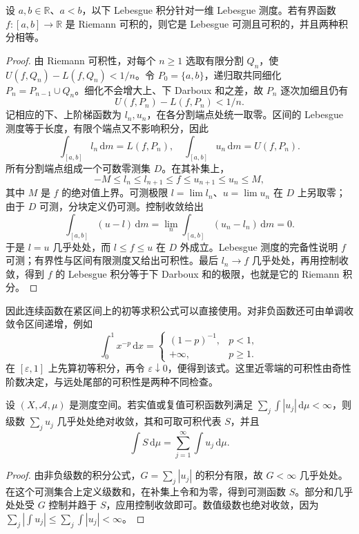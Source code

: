\begin{proposition}\label{b1:prop:riemann-lebesgue-compatibility}
设 \(a,b\in\mathbb R\)、\(a<b\)，以下 Lebesgue 积分针对一维 Lebesgue 测度。若有界函数 \(f:[a,b]\rightarrow\mathbb R\) 是 Riemann 可积的，则它是 Lebesgue 可测且可积的，并且两种积分相等。
\end{proposition}
\begin{proof}
由 Riemann 可积性，对每个 \(n\geq1\) 选取有限分割 \(Q_n\)，使 \(U(f,Q_n)-L(f,Q_n)<1/n\)。令 \(P_0=\{a,b\}\)，递归取共同细化 \(P_n=P_{n-1}\cup Q_n\)。细化不会增大上、下 Darboux 和之差，故 \(P_n\) 逐次加细且仍有
\[
U(f,P_n)-L(f,P_n)<1/n.
\]
记相应的下、上阶梯函数为 \(l_n,u_n\)，在各分割端点处统一取零。区间的 Lebesgue 测度等于长度，有限个端点又不影响积分，因此
\[
\int_{[a,b]}l_n\,\mathrm dm=L(f,P_n),
\quad
\int_{[a,b]}u_n\,\mathrm dm=U(f,P_n).
\]
所有分割端点组成一个可数零测集 \(D\)。在其补集上，
\[
-M\leq l_n\leq l_{n+1}\leq f\leq u_{n+1}\leq u_n\leq M,
\]
其中 \(M\) 是 \(f\) 的绝对值上界。可测极限 \(l=\lim l_n\)、\(u=\lim u_n\) 在 \(D\) 上另取零；由于 \(D\) 可测，分块定义仍可测。控制收敛给出
\[
\int_{[a,b]}(u-l)\,\mathrm dm
=\lim_n\int_{[a,b]}(u_n-l_n)\,\mathrm dm=0.
\]
于是 \(l=u\) 几乎处处，而 \(l\leq f\leq u\) 在 \(D\) 外成立。Lebesgue 测度的完备性说明 \(f\) 可测；有界性与区间有限测度又给出可积性。最后 \(l_n\to f\) 几乎处处，再用控制收敛，得到 \(f\) 的 Lebesgue 积分等于下 Darboux 和的极限，也就是它的 Riemann 积分。
\end{proof}

因此连续函数在紧区间上的初等求积公式可以直接使用。对非负函数还可由单调收敛令区间递增，例如
\[
\int_0^1 x^{-p}\,\mathrm dx=
\begin{cases}
(1-p)^{-1},&p<1,\\
+\infty,&p\geq1.
\end{cases}
\]
在 \([\varepsilon,1]\) 上先算初等积分，再令 \(\varepsilon\downarrow0\)，便得到该式。这里近零端的可积性由奇性阶数决定，与远处尾部的可积性是两种不同检查。

\begin{corollary}\label{b1:cor:absolute-series-integral}
设 \((X,\mathcal A,\mu)\) 是测度空间。若实值或复值可积函数列满足 \(\sum_j\int|u_j|\,\mathrm d\mu<\infty\)，则级数 \(\sum_ju_j\) 几乎处处绝对收敛，其和可取可积代表 \(S\)，并且
\[
\int S\,\mathrm d\mu=\sum_{j=1}^{\infty}\int u_j\,\mathrm d\mu.
\]
\end{corollary}
\begin{proof}
由非负级数的积分公式，\(G=\sum_j|u_j|\) 的积分有限，故 \(G<\infty\) 几乎处处。在这个可测集合上定义级数和，在补集上令和为零，得到可测函数 \(S\)。部分和几乎处处受 \(G\) 控制并趋于 \(S\)，应用控制收敛即可。数值级数也绝对收敛，因为 \(\sum_j|\int u_j|\leq\sum_j\int|u_j|<\infty\)。
\end{proof}

